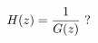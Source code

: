 \documentclass[preview]{standalone}
\begin{document}
\begin{align*}
\special{dvisvgm:raw <g id='unique000'>}H(z)=\frac{1}{G(z)}\ ?\special{dvisvgm:raw </g>}
\end{align*}
\end{document}
